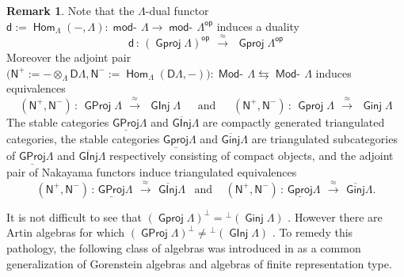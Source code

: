 \documentclass[oneside, a4paper,reqno]{amsart}
\numberwithin{equation}{section}
\theoremstyle{definition}
\newtheorem{rem}[thm]{Remark}
\begin{document}
\begin{rem}
Note that the $\Lambda$-dual functor $\mathsf{d} :=
\operatorname{\mathsf{Hom}}_{\Lambda}(-,\Lambda) : \operatorname*{\mathsf{mod}-\!}\Lambda \to \operatorname*{\mathsf{mod}-\!}\Lambda^\operatorname*{\mathsf{op}}$
induces a duality
\[
\mathsf{d} \, : \, ({\operatorname{\mathsf{Gproj}}\nolimits}\Lambda)^\operatorname*{\mathsf{op}} \,\
\stackrel{\approx}{\longrightarrow} \,\ {\operatorname{\mathsf{Gproj}}\nolimits}\Lambda^\operatorname*{\mathsf{op}}
\]
Moreover the adjoint pair $\bigl(\mathsf{N}^{+}:=
-\otimes_{\Lambda}\mathsf{D}\Lambda, \mathsf{N}^{-} :=
\operatorname{\mathsf{Hom}}_{\Lambda}(\mathsf{D}\Lambda,-)\bigr) \colon \operatorname*{\mathsf{Mod}-\!}\Lambda
\leftrightarrows \operatorname*{\mathsf{Mod}-\!}\Lambda$ induces equivalences
\[
(\mathsf{N}^{+},\mathsf{N}^{-}) \, : \, {\operatorname{\mathsf{GProj}}\nolimits}\Lambda\,\
\stackrel{\approx}{\longrightarrow} \,\ {\operatorname{\mathsf{GInj}}\nolimits}\Lambda \,\,\,\,\,\,\,\,\
\text{and} \,\,\,\,\,\,\,\,\ (\mathsf{N}^{+},\mathsf{N}^{-}) \, : \,
{\operatorname{\mathsf{Gproj}}\nolimits}\Lambda\,\ \stackrel{\approx}{\longrightarrow} \,\ {\operatorname{\mathsf{Ginj}}\nolimits}\Lambda
\]
The stable categories  ${\operatorname{\underline{\mathsf{GProj}}}\nolimits}\Lambda$ and ${\operatorname{\overline{\mathsf{GInj}}}\nolimits}\Lambda$ are
compactly generated triangulated categories, the stable categories
${\operatorname{\underline{\mathsf{Gproj}}}\nolimits}\Lambda$ and ${\operatorname{\overline{\mathsf{Ginj}}}\nolimits}\Lambda$ are triangulated subcategories
of ${\operatorname{\underline{\mathsf{GProj}}}\nolimits}\Lambda$ and ${\operatorname{\overline{\mathsf{GInj}}}\nolimits}\Lambda$ respectively  consisting of
compact objects, and  the adjoint pair of Nakayama functors induce
triangulated equivalences
\[
(\mathsf{N}^{+},\mathsf{N}^{-}) \, : \, {\operatorname{\underline{\mathsf{GProj}}}\nolimits}\Lambda\,\
\stackrel{\approx}{\longrightarrow} \,\ {\operatorname{\overline{\mathsf{GInj}}}\nolimits}\Lambda \,\,\,\,\, \text{and}
\,\,\,\,\,\,\, (\mathsf{N}^{+},\mathsf{N}^{-}) \, : \,
{\operatorname{\underline{\mathsf{Gproj}}}\nolimits}\Lambda\,\ \stackrel{\approx}{\longrightarrow} \,\ {\operatorname{\overline{\mathsf{Ginj}}}\nolimits}\Lambda.
\]
\end{rem}

It is not difficult to see that $({\operatorname{\mathsf{Gproj}}\nolimits}\Lambda)^{\bot} =
{^{\bot}}({\operatorname{\mathsf{Ginj}}\nolimits}\Lambda)$ \cite{B:cm}. However there are Artin
algebras for which $({\operatorname{\mathsf{GProj}}\nolimits}{\Lambda})^{\bot} \neq {^{\bot}}({\operatorname{\mathsf{GInj}}\nolimits}{\Lambda})$
\cite{BK}. To remedy this pathology, the following class of algebras
was introduced in \cite{BR} as a common generalization of Gorenstein
algebras and algebras of finite representation type.
\end{document}
